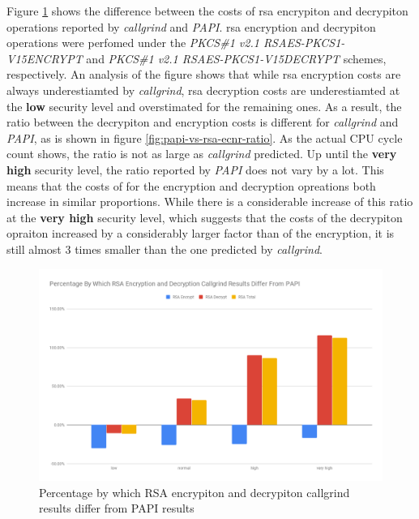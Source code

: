 \documentclass{llncs}
\begin{document}
Figure \ref{fig:papi-vs-callgrind-rsa-encr-cost} shows the difference between the costs of \gls{rsa} encrypiton and decrypiton operations
reported by \textit{callgrind} and \textit{PAPI}. \gls{rsa} encryption and decrypiton operations were perfomed under the \textit{PKCS\#1 v2.1 RSAES-PKCS1-V15ENCRYPT}
and \textit{PKCS\#1 v2.1 RSAES-PKCS1-V15DECRYPT} schemes, respectively.
An analysis of the figure shows that while \gls{rsa} encryption costs are always underestiamted by \textit{callgrind}, \gls{rsa} decryption costs
are underestiamted at the \textbf{low} security level and overstimated for the remaining ones. As a result, the ratio between the decrypiton
and encryption costs is different for \textit{callgrind} and \textit{PAPI}, as is shown in figure \ref{fig:papi-vs-rsa-ecnr-ratio}. As the
actual CPU cycle count shows, the ratio is not as large as \textit{callgrind} predicted. Up until the \textbf{very high} security level,
the ratio reported by \textit{PAPI} does not vary by a lot. This means that the costs of for the encryption and decryption opreations both
increase in similar proportions. While there is a considerable increase of this ratio at the \textbf{very high} security level, which
suggests that the costs of the decrypiton opraiton increased by a considerably larger factor than of the encryption, it is still almost
$3$ times smaller than the one predicted by \textit{callgrind}.

\begin{figure}
  \centering
  \includegraphics[width=1.0\textwidth]{img/papi-vs-callgrind-rsa-encr-cost.png}
  \centering \caption{\label{fig:papi-vs-callgrind-rsa-encr-cost} Percentage by which RSA encrypiton and decrypiton callgrind results differ from PAPI results}
\end{figure}
\end{document}
